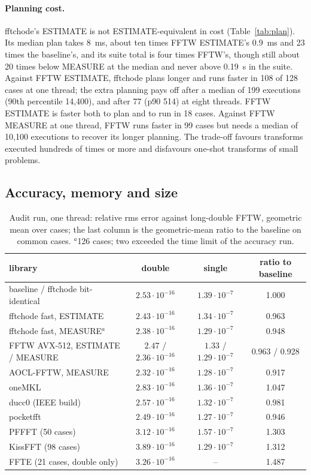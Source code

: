 \documentclass[10pt]{article}
\theoremstyle{definition}
\begin{document}
\paragraph{Planning cost.} fftchode's ESTIMATE is not ESTIMATE-equivalent in cost (Table~\ref{tab:plan}). Its median plan takes 8~ms, about ten times FFTW ESTIMATE's 0.9~ms and 23 times the baseline's, and its suite total is four times FFTW's, though still about 20 times below MEASURE at the median and never above 0.19~s in the suite. Against FFTW ESTIMATE, fftchode plans longer and runs faster in 108 of 128 cases at one thread; the extra planning pays off after a median of 199 executions (90th percentile 14{,}400), and after 77 (p90 514) at eight threads. FFTW ESTIMATE is faster both to plan and to run in 18 cases. Against FFTW MEASURE at one thread, FFTW runs faster in 99 cases but needs a median of 10{,}100 executions to recover its longer planning. The trade-off favours transforms executed hundreds of times or more and disfavours one-shot transforms of small problems.

\subsection{Accuracy, memory and size}

\begin{table}[t]
\centering\small
\begin{tabular}{lccc}
\toprule
library & double & single & ratio to baseline\\
\midrule
baseline / fftchode bit-identical & $2.53\cdot10^{-16}$ & $1.39\cdot10^{-7}$ & 1.000\\
fftchode fast, ESTIMATE & $2.43\cdot10^{-16}$ & $1.34\cdot10^{-7}$ & 0.963\\
fftchode fast, MEASURE$^a$ & $2.38\cdot10^{-16}$ & $1.29\cdot10^{-7}$ & 0.948\\
FFTW AVX-512, ESTIMATE / MEASURE & $2.47$ / $2.36\cdot10^{-16}$ & $1.33$ / $1.29\cdot10^{-7}$ & 0.963 / 0.928\\
AOCL-FFTW, MEASURE & $2.32\cdot10^{-16}$ & $1.28\cdot10^{-7}$ & 0.917\\
oneMKL & $2.83\cdot10^{-16}$ & $1.36\cdot10^{-7}$ & 1.047\\
ducc0 (IEEE build) & $2.57\cdot10^{-16}$ & $1.32\cdot10^{-7}$ & 0.981\\
pocketfft & $2.49\cdot10^{-16}$ & $1.27\cdot10^{-7}$ & 0.946\\
PFFFT (50 cases) & $3.12\cdot10^{-16}$ & $1.57\cdot10^{-7}$ & 1.303\\
KissFFT (98 cases) & $3.89\cdot10^{-16}$ & $1.29\cdot10^{-7}$ & 1.312\\
FFTE (21 cases, double only) & $3.26\cdot10^{-16}$ & -- & 1.487\\
\bottomrule
\end{tabular}
\caption{Audit run, one thread: relative rms error against long-double FFTW, geometric mean over cases; the last column is the geometric-mean ratio to the baseline on common cases. $^a$126 cases; two exceeded the time limit of the accuracy run.}\label{tab:acc}
\end{table}
\end{document}
